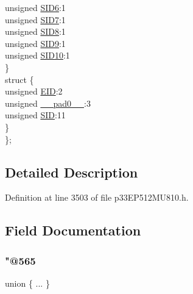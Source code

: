 \begin{DoxyCompactItemize}
\begin{tabbing}
\>\>unsigned \hyperlink{structtag_c1_r_x_m1_s_i_d_b_i_t_s_a70d70952133eb2389d5c326f9f0e8035}{SID6}:1\\
\>\>unsigned \hyperlink{structtag_c1_r_x_m1_s_i_d_b_i_t_s_a34097fb76decd431701fa2d86a22328e}{SID7}:1\\
\>\>unsigned \hyperlink{structtag_c1_r_x_m1_s_i_d_b_i_t_s_afe74894633244fdb0b0c01b4e8c522e7}{SID8}:1\\
\>\>unsigned \hyperlink{structtag_c1_r_x_m1_s_i_d_b_i_t_s_a33587704948067005c2a6a3ccc503c99}{SID9}:1\\
\>\>unsigned \hyperlink{structtag_c1_r_x_m1_s_i_d_b_i_t_s_a1a9084031c7f5fb16007feeebf0d8216}{SID10}:1\\
\>\} \\
\>struct \{\\
\>\>unsigned \hyperlink{structtag_c1_r_x_m1_s_i_d_b_i_t_s_ae80b378c9141f7c03e0b4e55b5f4b54d}{EID}:2\\
\>\>unsigned \hyperlink{structtag_c1_r_x_m1_s_i_d_b_i_t_s_adf71f3d8410c1f1dbbc96680a92c49af}{\_\_pad0\_\_}:3\\
\>\>unsigned \hyperlink{structtag_c1_r_x_m1_s_i_d_b_i_t_s_af88edf93b2fee2432665bd84f51287e4}{SID}:11\\
\>\} \\
\}; \\

\end{tabbing}\end{DoxyCompactItemize}


\subsection{Detailed Description}


Definition at line 3503 of file p33\+E\+P512\+M\+U810.\+h.



\subsection{Field Documentation}
\mbox{\label{structtag_c1_r_x_m1_s_i_d_b_i_t_s_a4276e6357e0abbc40201f920978b5b75}} 
\subsubsection{\texorpdfstring{"@565}{@565}}
{\footnotesize\ttfamily union \{ ... \} }

\mbox{\label{structtag_c1_r_x_m1_s_i_d_b_i_t_s_adf71f3d8410c1f1dbbc96680a92c49af}} 
